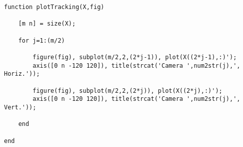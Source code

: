 \begin{verbatim}
function plotTracking(X,fig)

    [m n] = size(X);

    for j=1:(m/2)
		
        figure(fig), subplot(m/2,2,(2*j-1)), plot(X((2*j-1),:)');
        axis([0 n -120 120]), title(strcat('Camera ',num2str(j),', Horiz.'));
		
        figure(fig), subplot(m/2,2,(2*j)), plot(X((2*j),:)');
        axis([0 n -120 120]), title(strcat('Camera ',num2str(j),', Vert.'));
		
    end
	
end  
\end{verbatim}